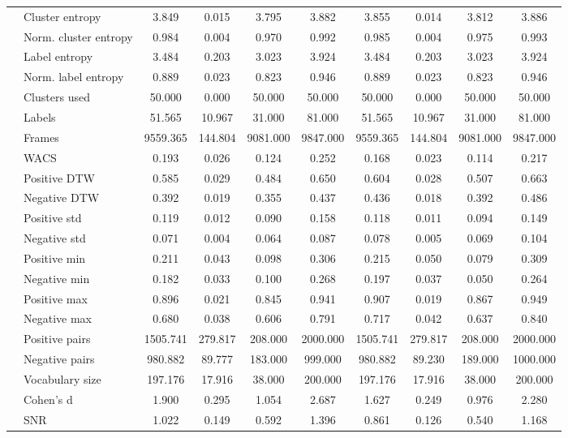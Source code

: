 \begin{longtable}{lp{2.8cm}cccccccc}
 & Cluster entropy & 3.849 & 0.015 & 3.795 & 3.882 & 3.855 & 0.014 & 3.812 & 3.886 \\
 & Norm. cluster entropy & 0.984 & 0.004 & 0.970 & 0.992 & 0.985 & 0.004 & 0.975 & 0.993 \\
 & Label entropy & 3.484 & 0.203 & 3.023 & 3.924 & 3.484 & 0.203 & 3.023 & 3.924 \\
 & Norm. label entropy & 0.889 & 0.023 & 0.823 & 0.946 & 0.889 & 0.023 & 0.823 & 0.946 \\
 & Clusters used & 50.000 & 0.000 & 50.000 & 50.000 & 50.000 & 0.000 & 50.000 & 50.000 \\
 & Labels & 51.565 & 10.967 & 31.000 & 81.000 & 51.565 & 10.967 & 31.000 & 81.000 \\
 & Frames & 9559.365 & 144.804 & 9081.000 & 9847.000 & 9559.365 & 144.804 & 9081.000 & 9847.000 \\
 & WACS & 0.193 & 0.026 & 0.124 & 0.252 & 0.168 & 0.023 & 0.114 & 0.217 \\
 & Positive DTW & 0.585 & 0.029 & 0.484 & 0.650 & 0.604 & 0.028 & 0.507 & 0.663 \\
 & Negative DTW & 0.392 & 0.019 & 0.355 & 0.437 & 0.436 & 0.018 & 0.392 & 0.486 \\
 & Positive std & 0.119 & 0.012 & 0.090 & 0.158 & 0.118 & 0.011 & 0.094 & 0.149 \\
 & Negative std & 0.071 & 0.004 & 0.064 & 0.087 & 0.078 & 0.005 & 0.069 & 0.104 \\
 & Positive min & 0.211 & 0.043 & 0.098 & 0.306 & 0.215 & 0.050 & 0.079 & 0.309 \\
 & Negative min & 0.182 & 0.033 & 0.100 & 0.268 & 0.197 & 0.037 & 0.050 & 0.264 \\
 & Positive max & 0.896 & 0.021 & 0.845 & 0.941 & 0.907 & 0.019 & 0.867 & 0.949 \\
 & Negative max & 0.680 & 0.038 & 0.606 & 0.791 & 0.717 & 0.042 & 0.637 & 0.840 \\
 & Positive pairs & 1505.741 & 279.817 & 208.000 & 2000.000 & 1505.741 & 279.817 & 208.000 & 2000.000 \\
 & Negative pairs & 980.882 & 89.777 & 183.000 & 999.000 & 980.882 & 89.230 & 189.000 & 1000.000 \\
 & Vocabulary size & 197.176 & 17.916 & 38.000 & 200.000 & 197.176 & 17.916 & 38.000 & 200.000 \\
 & Cohen's d & 1.900 & 0.295 & 1.054 & 2.687 & 1.627 & 0.249 & 0.976 & 2.280 \\
 & SNR & 1.022 & 0.149 & 0.592 & 1.396 & 0.861 & 0.126 & 0.540 & 1.168 \\

\end{longtable}

